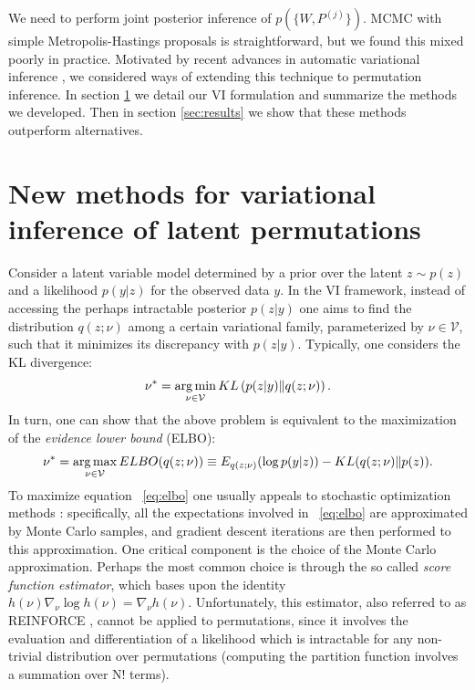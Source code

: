 \documentclass{article}
\begin{document}
We need to perform joint posterior inference of $p(\{W,P^{(j)}\})$.
MCMC with simple Metropolis-Hastings proposals is straightforward, but
we found this mixed poorly in practice. Motivated by recent advances
in automatic variational inference \citep{Blei2017}, we considered
ways of extending this technique to permutation inference.  In section
\ref{sec:VI} we detail our VI formulation and summarize the methods we
developed. Then in section \ref{sec:results} we show that these
methods outperform alternatives.

 \section{New methods for variational inference of latent permutations}
  \label{sec:VI}
 Consider a latent variable model  determined by a prior over the latent $z\sim p(z)$ and a likelihood $p(y|z)$ for the observed data $y$. In the VI framework, instead of accessing the perhaps intractable posterior $p(z|y)$ one aims to find the distribution $q(z;\nu)$ among a certain variational family, parameterized by $\nu\in \mathcal{V}$, such that it minimizes its discrepancy with $p(z|y)$. Typically, one considers the KL divergence:
 \begin{equation} \nu^* = \argmin_{\nu\in\mathcal{V}} KL\left(p(z|y)\lVert q(z;\nu)\right).\end{equation}
In turn, one can show that the above problem is equivalent to the maximization of the \emph{evidence lower bound} (ELBO):
 \begin{equation}\label{eq:elbo} \nu^* = \argmax_{\nu\in\mathcal{V}} ELBO(q(z;\nu))\equiv  E_{q(z;\nu)}(\log p(y|z)) - KL(q(z;\nu)\lVert p(z)).\end{equation}
 To maximize equation ~\eqref{eq:elbo} one usually appeals to stochastic optimization methods \citep{Kushner1987}: specifically, all the expectations involved in ~\eqref{eq:elbo} are approximated by Monte Carlo samples, and gradient descent iterations are then performed to this approximation. One critical component is the choice of the Monte Carlo approximation. Perhaps the most common choice is through the so called \emph{score function estimator}, which bases upon the identity $h(\nu) \nabla_\nu \log h(\nu) =\nabla_\nu h(\nu)$. Unfortunately, this estimator, also referred to as REINFORCE \citep{Williams1992}, cannot be applied to permutations, since it involves the evaluation and differentiation of a likelihood which is intractable for any non-trivial distribution over permutations (computing the partition function involves a summation over N! terms).
 
\end{document}

